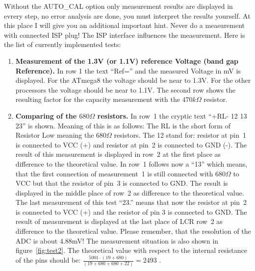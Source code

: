 Without the AUTO\_CAL option only measurement results are displayed in evrery step, no error analysis are done, you must interpret the results yourself.
At this place I will give you an additional important hint. Never do a measurement with connected ISP plug!
The ISP interface influences the measurement. 
\vspace{1cm}
Here is the list of currently implemented tests:
\vspace{1cm}
\begin{enumerate}
\item {\bf Measurement of the 1.3V (or 1.1V) reference Voltage (band gap Reference).}
In row 1 the text ``Ref='' and the measured Voltage in mV is displayed.
For the ATmega8 the voltage should be near to 1.3V. For the other processors the voltage should be near to 1.1V.
The second row shows the resulting factor for the capacity measurement with the \(470k\Omega\) resistor.
\item {\bf Comparing of the  \(680\Omega\) resistors.}
In row~1 the cryptic text  ``+RL- 12 13 23'' is shown. Meaning of this is as follows: 
The RL is the short form of Resistor Low meaning the \(680\Omega\) resistors. The 12 stand for: 
resistor at pin~1 is connected to VCC (+) and resistor at pin~2 is connected to GND (-). 
The result of this measurement  is displayed in row~2 at the first place as difference to the theoretical value. 
 In row~1 follows now a ``13'' which means, that the first connection of measurement~1 is still connected
with \(680\Omega\) to VCC but that the resistor of pin~3 is connected to GND.
The result is displayed in the middle place of row~2 as difference to the theoretical value. 
The last measurement of this test ``23.'' means that now the resistor at pin~2 is connected to VCC (+) and
the resistor of pin 3 is connected to GND.
The result of measurement is displayed at the last place of LCR row~2 as difference to the theoretical value.
Please remember, that the resolution of the ADC is about 4.88mV!
The measurement situation is also shown in figure~\ref{fig:test2}.
The theoretical value with respect to the internal resistance of the pins should be: 
\(\frac{5001 \cdot  (19+680)}{ (19+680+680+22)} = 2493\) .


\end{enumerate}
